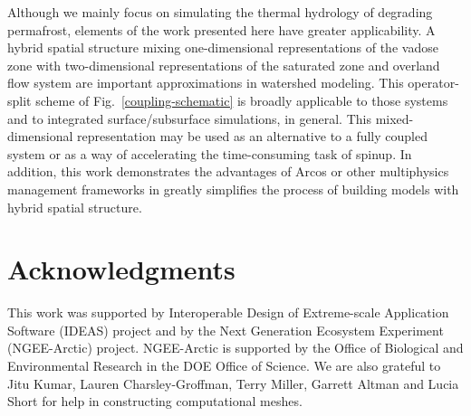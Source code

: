 \documentclass[review,11pt]{elsarticle}
\begin{document}
Although we mainly focus on simulating the thermal hydrology of degrading permafrost, elements of the work presented here have greater applicability. A hybrid spatial structure mixing one-dimensional representations of the vadose zone with two-dimensional representations of the saturated zone and overland flow system are important approximations in watershed modeling.  This operator-split scheme of Fig.~\ref{coupling-schematic} is broadly applicable to those systems and to integrated surface/subsurface simulations, in general. This mixed-dimensional representation may be used as an alternative to a fully coupled system or as a way of accelerating the time-consuming task of spinup. In addition, this work demonstrates the advantages of Arcos or other multiphysics management frameworks in greatly simplifies the process of building models with hybrid spatial structure.

\section*{Acknowledgments} 

This work was supported by Interoperable Design of Extreme-scale Application Software (IDEAS) project and by the Next Generation Ecosystem Experiment
(NGEE-Arctic) project. NGEE-Arctic is supported by the Office of Biological and Environmental Research in the DOE Office of Science. We are also
grateful to Jitu Kumar, Lauren Charsley-Groffman, Terry Miller, Garrett Altman and Lucia Short  for help in constructing computational meshes. 


\appendix
\end{document}
